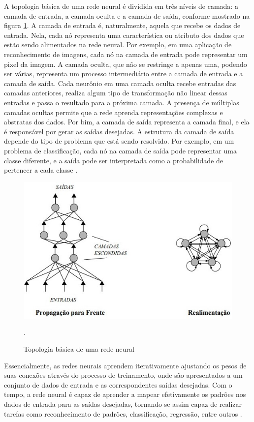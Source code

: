   A topologia básica de uma rede neural é dividida em três níveis de camada: a camada de entrada, a camada oculta e a camada de saída, conforme mostrado na figura \ref{fig:topologia}. A camada de entrada é, naturalmente, aquela que recebe os dados de entrada. Nela, cada nó representa uma característica ou atributo dos dados que estão sendo alimentados na rede neural. Por exemplo, em uma aplicação de reconhecimento de imagens, cada nó na camada de entrada pode representar um pixel da imagem. A camada oculta, que não se restringe a apenas uma, podendo ser várias, representa um processo intermediário entre a camada de entrada e a camada de saída. Cada neurônio em uma camada oculta recebe entradas das camadas anteriores, realiza algum tipo de transformação não linear dessas entradas e passa o resultado para a próxima camada. A presença de múltiplas camadas ocultas permite que a rede aprenda representações complexas e abstratas dos dados. Por bim, a camada de saída representa a camada final, e ela é responsável por gerar as saídas desejadas. A estrutura da camada de saída depende do tipo de problema que está sendo resolvido. Por exemplo, em um problema de classificação, cada nó na camada de saída pode representar uma classe diferente, e a saída pode ser interpretada como a probabilidade de pertencer a cada classe \cite{rauber2005redes}.
  
  \begin{figure}[!h]
      \centering
      \begin{minipage}{0.9\linewidth}
      \centering
      \captionsetup{justification=centering,margin=0.5cm,font=small}
      \includegraphics[width=0.7\linewidth]{img/cap2/topologia-rede.jpeg}
      \caption{Topologia básica de uma rede neural \cite{fleck2016redes}}.
      \label{fig:topologia}
      \end{minipage}
  \end{figure}  

Essencialmente, as redes neurais aprendem iterativamente ajustando os pesos de suas conexões através do processo de treinamento, onde são apresentados a um conjunto de dados de entrada e as correspondentes saídas desejadas. Com o tempo, a rede neural é capaz de aprender a mapear efetivamente os padrões nos dados de entrada para as saídas desejadas, tornando-se assim capaz de realizar tarefas como reconhecimento de padrões, classificação, regressão, entre outros \cite{haykin2001redes}.

